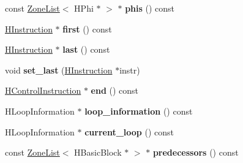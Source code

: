 \begin{DoxyCompactItemize}
\item 
\hypertarget{classv8_1_1internal_1_1_v8___f_i_n_a_l_a3d07d8d071f78903c0530e137c2cbdd4}{}const \hyperlink{classv8_1_1internal_1_1_zone_list}{Zone\+List}$<$ H\+Phi $\ast$ $>$ $\ast$ {\bfseries phis} () const \label{classv8_1_1internal_1_1_v8___f_i_n_a_l_a3d07d8d071f78903c0530e137c2cbdd4}

\item 
\hypertarget{classv8_1_1internal_1_1_v8___f_i_n_a_l_a921c47fb187fc36bb37cc4be66fa3142}{}\hyperlink{classv8_1_1internal_1_1_h_instruction}{H\+Instruction} $\ast$ {\bfseries first} () const \label{classv8_1_1internal_1_1_v8___f_i_n_a_l_a921c47fb187fc36bb37cc4be66fa3142}

\item 
\hypertarget{classv8_1_1internal_1_1_v8___f_i_n_a_l_a979aad90609e26fd774f1e2dc443f4e3}{}\hyperlink{classv8_1_1internal_1_1_h_instruction}{H\+Instruction} $\ast$ {\bfseries last} () const \label{classv8_1_1internal_1_1_v8___f_i_n_a_l_a979aad90609e26fd774f1e2dc443f4e3}

\item 
\hypertarget{classv8_1_1internal_1_1_v8___f_i_n_a_l_a114911325cac6e8fc0c6ed3474967745}{}void {\bfseries set\+\_\+last} (\hyperlink{classv8_1_1internal_1_1_h_instruction}{H\+Instruction} $\ast$instr)\label{classv8_1_1internal_1_1_v8___f_i_n_a_l_a114911325cac6e8fc0c6ed3474967745}

\item 
\hypertarget{classv8_1_1internal_1_1_v8___f_i_n_a_l_a6f2a2aab747fae2bbf7eb2fa02d12f5b}{}\hyperlink{classv8_1_1internal_1_1_h_control_instruction}{H\+Control\+Instruction} $\ast$ {\bfseries end} () const \label{classv8_1_1internal_1_1_v8___f_i_n_a_l_a6f2a2aab747fae2bbf7eb2fa02d12f5b}

\item 
\hypertarget{classv8_1_1internal_1_1_v8___f_i_n_a_l_a8ded52ffcb9c1c1608d8b47d7753737b}{}H\+Loop\+Information $\ast$ {\bfseries loop\+\_\+information} () const \label{classv8_1_1internal_1_1_v8___f_i_n_a_l_a8ded52ffcb9c1c1608d8b47d7753737b}

\item 
\hypertarget{classv8_1_1internal_1_1_v8___f_i_n_a_l_a718eeba3c6745dc42491a160f47417bb}{}H\+Loop\+Information $\ast$ {\bfseries current\+\_\+loop} () const \label{classv8_1_1internal_1_1_v8___f_i_n_a_l_a718eeba3c6745dc42491a160f47417bb}

\item 
\hypertarget{classv8_1_1internal_1_1_v8___f_i_n_a_l_a7cacbe213005ea9606174a8e908b1cae}{}const \hyperlink{classv8_1_1internal_1_1_zone_list}{Zone\+List}$<$ H\+Basic\+Block $\ast$ $>$ $\ast$ {\bfseries predecessors} () const \label{classv8_1_1internal_1_1_v8___f_i_n_a_l_a7cacbe213005ea9606174a8e908b1cae}


\end{DoxyCompactItemize}
